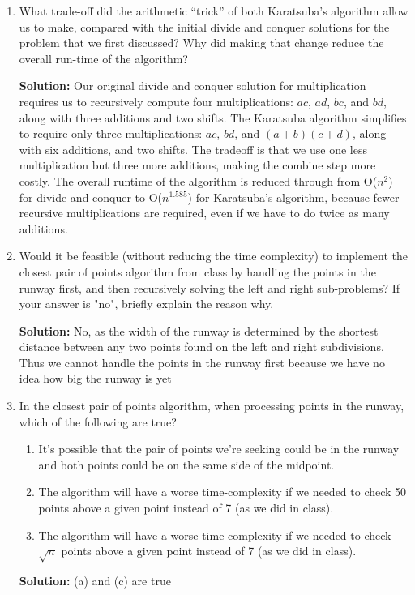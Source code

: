 \documentclass[10pt]{article}
\begin{document}
    \begin{enumerate}   
    	\item What trade-off did the arithmetic “trick” of both Karatsuba's algorithm allow us to make, compared with the initial divide and conquer solutions for the problem that we first discussed? Why did making that change reduce the overall run-time of the algorithm?

        \textbf{Solution:}
        Our original divide and conquer solution for multiplication requires us to recursively compute four multiplications: $ac$, $ad$, $bc$, and $bd$, along with three additions and two shifts. The Karatsuba algorithm simplifies to require only three multiplications: $ac$, $bd$, and $(a+b)(c+d)$, along with six additions, and two shifts. The tradeoff is that we use one less multiplication but three more additions, making the combine step more costly. The overall runtime of the algorithm is reduced through from O($n^2$) for divide and conquer to O($n^1.585$) for Karatsuba's algorithm, because fewer recursive multiplications are required, even if we have to do twice as many additions.

        \item Would it be feasible (without reducing the time complexity) to implement the closest pair of points algorithm from class by handling the points in the runway first, and then recursively solving the left and right sub-problems?  If your answer is "no", briefly explain the reason why.

        \textbf{Solution:}  No, as the width of the runway is determined by the shortest distance between any two points found on the left and right subdivisions. Thus we cannot handle the points in the runway first because we have no idea how big the runway is yet

        \item In the closest pair of points algorithm, when processing points in the runway, which of the following are true?
    		\begin{enumerate} 
    		\item It's possible that the pair of points we're seeking could be in the runway and both points could be on the same side of the midpoint.
   		    \item The algorithm will have a worse time-complexity if we needed to check 50 points above a given point instead of 7 (as we did in class).
       		\item The algorithm will have a worse time-complexity if we needed to check $\sqrt{n}$ points above a given point instead of 7 (as we did in class).
    		\end{enumerate} 
    	
    	\textbf{Solution:} (a) and (c) are true
    	
    \end{enumerate} 
\end{document}
